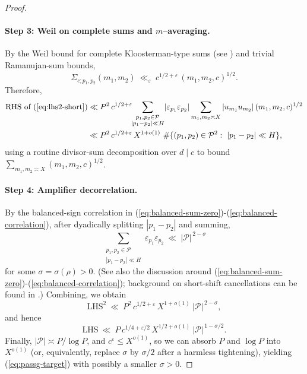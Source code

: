 \documentclass[11pt]{article}
\def\eqref#1{(\ref{#1})}%
\theoremstyle{definition}
\theoremstyle{remark}
\numberwithin{equation}{part}
\begin{document}
\begin{proof}
	\paragraph{Step 3: Weil on complete sums and $m$–averaging.}
	By the Weil bound for complete Kloosterman-type sums (see \cite[Ch.~11, \S11.10]{IK}) and trivial Ramanujan-sum bounds,
	\begin{equation}\label{eq:weil}
		\Sigma_{c;p_1,p_2}(m_1,m_2)\ \ll_\varepsilon\ c^{1/2+\varepsilon}\,(m_1,m_2,c)^{1/2}.
	\end{equation}
	Therefore,
	\begin{align*}
		\text{RHS of }\eqref{eq:lhs2-short}
		 & \ll P^2\, c^{1/2+\varepsilon}\!\!\sum_{\substack{p_1,p_2\in\mathcal P                        \\ |p_1-p_2|\ll H}}\! |\varepsilon_{p_1}\varepsilon_{p_2}|
		\sum_{m_1,m_2\asymp X} |u_{m_1}u_{m_2}|\,(m_1,m_2,c)^{1/2}                                      \\
		 & \ll P^2\, c^{1/2+\varepsilon}\, X^{1+o(1)}\ \#\{(p_1,p_2)\in\mathcal P^2:\ |p_1-p_2|\ll H\},
	\end{align*}
	using a routine divisor-sum decomposition over $d\mid c$ to bound $\sum_{m_1,m_2\asymp X}(m_1,m_2,c)^{1/2}$.

	\paragraph{Step 4: Amplifier decorrelation.}
	By the balanced-sign correlation in \eqref{eq:balanced-sum-zero}-\eqref{eq:balanced-correlation}, after dyadically splitting $|p_1-p_2|$ and summing,
	\begin{equation}\label{eq:paircount}
		\sum_{\substack{p_1,p_2\in\mathcal P\\ |p_1-p_2|\ll H}} \varepsilon_{p_1}\varepsilon_{p_2}\ \ll\ |\mathcal P|^{\,2-\sigma}
	\end{equation}
	for some $\sigma=\sigma(\rho)>0$.
	(See also the discussion around \eqref{eq:balanced-sum-zero}-\eqref{eq:balanced-correlation}; background on short-shift cancellations can be found in \cite[Ch.~2]{GrahamKolesnik}.)
	Combining, we obtain
	\[
		\text{LHS}^2\ \ll\ P^2\, c^{1/2+\varepsilon}\, X^{1+o(1)}\ |\mathcal P|^{\,2-\sigma},
	\]
	and hence
	\[
		\text{LHS}\ \ll\ P\, c^{1/4+\varepsilon/2}\, X^{1/2+o(1)}\ |\mathcal P|^{\,1-\sigma/2}.
	\]
	Finally, $|\mathcal P|\asymp P/\log P$, and $c^{\varepsilon}\le X^{o(1)}$, so we can absorb $P$ and $\log P$ into $X^{o(1)}$ (or, equivalently, replace $\sigma$ by $\sigma/2$ after a harmless tightening), yielding \eqref{eq:passg-target} with possibly a smaller $\sigma>0$.
\end{proof}
\end{document}
